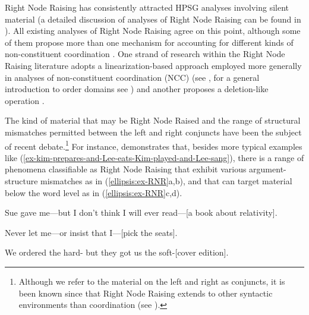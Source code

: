 Right Node Raising has consistently attracted HPSG analyses involving silent material (a detailed discussion of analyses of Right Node Raising can be found
in \crossrefchapteralt[\pageref{coordination:page-rnr-start}--\pageref{coordination:page-rnr-end}]{coordination}). 
All existing analyses of Right Node Raising \citep{Abeille2016, Beavers2004, Chaves2014, Crysmann2003, Shiraishi2019, Yatabe2001, Yatabe2012} agree on this point,
although some of them propose more than one mechanism for accounting for different kinds of non-constituent coordination \citep{Chaves2014, Yatabe2001, Yatabe2012, Yatabe2019}. One strand of research within the Right Node Raising literature adopts a linearization-based approach employed more generally in analyses of non-constituent coordination (NCC) (see \citealt{Yatabe2001, Yatabe2012}, for a general introduction to order domains see ) and another proposes a deletion-like operation \citep{Abeille2016, Chaves2014, Shiraishi2019}.

%

The kind of material that may be Right Node Raised and the range of structural mismatches permitted between the left and right conjuncts have been the subject of recent debate.\footnote{Although we refer to the material on the left and right as conjuncts, it is been known since \citet{Hudson1976,Hudson1989} that Right Node Raising extends to other syntactic environments than coordination (see \citealt{Chaves2014}).} For instance, \citet[839--840]{Chaves2014} demonstrates that, besides more typical examples like (\ref{ex-kim-prepares-and-Lee-eats-Kim-played-and-Lee-sang}),
 there is a range of phenomena classifiable as Right Node Raising that exhibit various argument-structure mismatches as in (\ref{ellipsis:ex-RNR}a,b), and that can target material below the word level as in (\ref{ellipsis:ex-RNR}c,d).
%

\ealnoraggedright
\label{ellipsis:ex-RNR}
\ex Sue gave me---but I don't think I will ever read---[a book about relativity]. \label{54}

\ex Never let me---or insist that I---[pick the seats].\label{55}

\ex We ordered the hard- but they got us the soft-[cover edition].\label{56}


